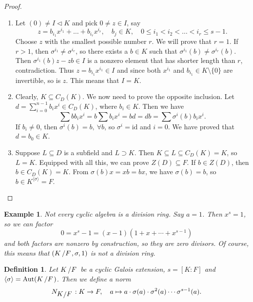 \documentclass[10pt, a4paper]{article}
\newtheorem{defi}[thm]{Definition}
\newenvironment{noticeB}{%
  \tcolorbox[%
  notitle,
  empty,
  enhanced,  %
  breakable,
  coltext=black,
  colback=white, 
  fontupper=\rmfamily,
  noparskip,
  sharp corners,
  boxrule=-1pt,  %
  frame hidden,
  left=7pt,  %
  right=7pt,
  top=5pt,
  bottom=5pt,
  before skip=2.5ex plus 2pt,
  after skip=2.5ex plus 2pt,
  borderline west = {1.5pt}{-0.1pt}{blue!30!black}, %
  overlay unbroken and last={%
    \draw[color=black, line width=1.25pt]
    ($(frame.south west)+(1.pt, -0.1pt)$) -- ++(2em, 0);
  }
  ]}
{\endtcolorbox}
\newenvironment{definition}{\begin{noticeB}\begin{defi}}{%
    \end{defi}\end{noticeB}}
\newtheorem{example}[thm]{Example}
\newenvironment{noticeC}{%
  \tcolorbox[%
  notitle,
  empty,
  enhanced,  %
  breakable,
  coltext=black, 
  fontupper=\rmfamily,
  noparskip,
  sharp corners,
  boxrule=-1pt,  %
  frame hidden,
  left=7pt,  %
  right=7pt,
  top=5pt,
  bottom=5pt,
  before skip=2.5ex plus 2pt,
  after skip=2.5ex plus 2pt,
  overlay unbroken and last={%
  },
  ]}
{\endtcolorbox}
\newenvironment{myproof}%
  {\begin{noticeC}\begin{proof}}%
  {\end{proof}\end{noticeC}}
\newcommand{\quot}[2]{{\raisebox{0em}{$#1$}\left/\raisebox{0em}{$#2$}\right.}}
\DeclareMathOperator{\aut}{Aut}
\begin{document}
\begin{myproof}
  \begin{enumerate}
    \item Let $(0) \neq I \lhd K$ and pick $0 \neq z \in I$, say 
    $$z = b_{i_1} x^{i_1} + \dots + b_{i_r} x^{i_r},\quad b_j \in K,\quad 0 \leq i_1 < i_2 < \dots < i_r \leq s - 1.$$
    Choose $z$ with the smallest possible number $r$. We will prove that $r = 1$.
    If $r > 1$, then $\sigma^{i_1} \neq \sigma^{i_r}$, so there exists a $b \in K$ such that 
    $\sigma^{i_1} (b) \neq \sigma^{i_r} (b)$. Then $\sigma^{i_1} (b) z - zb \in I$
    is a nonzero element that has shorter length than $r$, contradiction. Thus $z = b_{i_1} x^{i_1} \in I$ and since 
    both $x^{i_1}$ and $b_{i_1} \in K \setminus \{0\}$ are invertible, so is $z$. This means that $I = K$.
    \item Clearly, $K \subseteq C_D (K)$. We now need to prove the opposite inclusion.
    Let $d = \sum_{i = 0} ^{n - 1} b_i x^i \in C_D (K)$, where $b_i \in K$. Then we have 
    $$\sum b b_i x^i = b \sum b_i x^i = bd = db = \sum \sigma^i (b) b_i x^i.$$
    If $b_i \neq 0$, then $\sigma^i (b) = b,\ \forall b$, so $\sigma^i = \mathrm{id}$ and $i = 0$.
    We have proved that $d = b_0 \in K$.
    \item Suppose $L \subseteq D$ is a subfield and $L \supset K$. Then $K \subseteq L \subseteq C_D (K) = K$, so $L = K$.
    Equipped with all this, we can prove $Z(D) \subseteq F$. If $b \in Z(D)$, then $b \in C_D(K) = K$.
    From $\sigma(b) x = xb = bx$, we have $\sigma(b) = b$, so $b \in K^{\langle \sigma \rangle} = F$. \qedhere
  \end{enumerate}
\end{myproof}

\begin{example}
  Not every cyclic algebra is a division ring. Say $a = 1$.
  Then $x^s = 1$, so we can factor 
  $$0 = x^s - 1 = (x - 1) (1 + x + \cdots + x^{s - 1})$$
  and both factors are nonzero by construction, so they are zero divisors.
  Of course, this means that $(\quot{K}{F}, \sigma, 1)$ is not a division ring.
\end{example}

\begin{definition}
  Let $\quot{K}{F}$ be a cyclic Galois extension, $s = [K : F]$ and $\langle \sigma \rangle = \aut (\quot{K}{F})$.
  Then we define a norm
  $$N_{\quot{K}{F}}: K \to F,\quad a \mapsto a \cdot \sigma(a) \cdot \sigma^2(a) \cdots \sigma^{s - 1} (a).$$
\end{definition}
\end{document}
